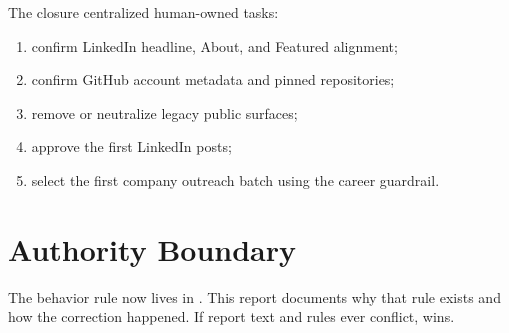 \documentclass[a4paper,11pt,openany]{report}
\begin{document}
The closure centralized human-owned tasks:

\begin{enumerate}
  \item confirm LinkedIn headline, About, and Featured alignment;
  \item confirm GitHub account metadata and pinned repositories;
  \item remove or neutralize legacy public surfaces;
  \item approve the first LinkedIn posts;
  \item select the first company outreach batch using the career guardrail.
\end{enumerate}

\chapter{Authority Boundary}


The behavior rule now lives in
. This report documents why that
rule exists and how the correction happened. If report text and rules ever
conflict,  wins.
\end{document}
